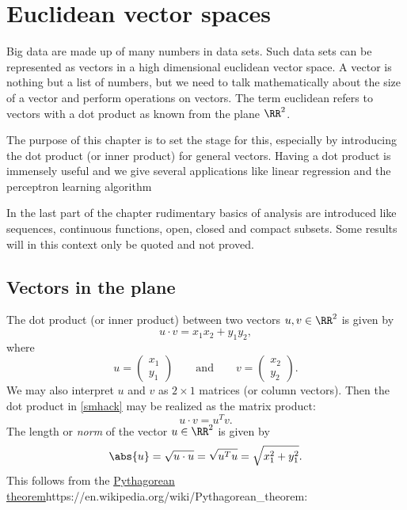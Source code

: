 \documentclass{article}
\begin{document}
\chapter{Euclidean vector spaces}

Big data are made up of many numbers in data sets. Such data sets can
be represented as vectors in a high dimensional euclidean vector
space. A vector is nothing but a list of numbers, but we need to talk
mathematically about the size of a vector and perform operations on
vectors. The term euclidean refers to vectors with a dot product as
known from the plane $\RR^2$.

The purpose of this chapter is to set the stage for this,
especially by introducing the dot product (or inner product) for
general vectors. Having a dot product is immensely useful and we give several
applications like linear regression and the perceptron learning algorithm

In the last part of the chapter rudimentary basics of analysis
are introduced like sequences, continuous functions, open, closed
and compact subsets. Some results will in this context only
be quoted and not proved.




\section{Vectors in the plane}

The dot product (or inner product) between two vectors $u, v\in \RR^2$ is
given by
\begin{equation}\label{smhack}
u\cdot v = x_1 x_2 + y_1 y_2,
\end{equation}
where
\begin{equation}
u = \begin{pmatrix} x_1 \\ y_1 \end{pmatrix}\qquad\text{and}\qquad
v = \begin{pmatrix} x_2 \\ y_2 \end{pmatrix}.
\end{equation}
We may also interpret
$u$ and $v$  as $2\times 1$ matrices (or column vectors).
Then the dot product in
\eqref{smhack} may be realized as the matrix product:
$$
u\cdot v = u^T v.
$$
The length or \emph{norm} of the vector $u\in \RR^2$ is given by
$$
\abs{u} = \sqrt{u\cdot u} = \sqrt{u^T u} = \sqrt{x_1^2 + y_1^2}.
$$
This follows from the \url{Pythagorean theorem}{https://en.wikipedia.org/wiki/Pythagorean_theorem}:
\end{document}
